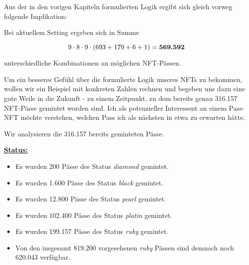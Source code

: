 
Aus der in den vorigen Kapiteln formulierten Logik ergibt sich gleich vorweg folgende Implikation:

\vspace{0.3cm}

\begin{Fazit}

Bei aktuellem Setting ergeben sich in Summe

\begin{equation*}
9 \cdot 8 \cdot 9 \cdot \left(693 + 179 + 6 + 1 \right) = \textrm{\textbf{569.592}}
\end{equation*} 

unterschiedliche Kombinationen an möglichen NFT-Pässen.
	
\end{Fazit}


\vspace{0.3cm}

Um ein besseres Gefühl über die formulierte Logik unseres NFTs zu bekommen, wollen wir ein Beispiel mit konkreten Zahlen rechnen und begeben uns dazu eine gute Weile in die Zukunft - zu einem Zeitpunkt, zu dem bereits genau 316.157 NFT-Pässe gemintet worden sind. Ich als potenzieller Interessent an einem Pass-NFT möchte verstehen, welchen Pass ich als nächsten in etwa zu erwarten hätte.

\vspace{0.2cm} 

Wir analysieren die 316.157 bereits geminteten Pässe.

\vspace{0.5cm} 

\underline{\textbf{Status:}}

\begin{itemize}
  \item Es wurden 200 Pässe des Status \textit{diamond} gemintet.
  \item Es wurden 1.600 Pässe des Status \textit{black} gemintet.
  \item Es wurden 12.800 Pässe des Status \textit{pearl} gemintet.
  \item Es wurden 102.400 Pässe des Status \textit{platin} gemintet.
  \item Es wurden 199.157 Pässe des Status \textit{ruby} gemintet.
  \item Von den insgesamt 819.200 vorgesehenen \textit{ruby} Pässen sind demnach noch 620.043 verfügbar.
\end{itemize}

